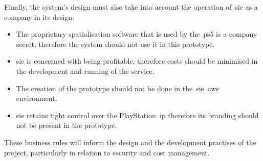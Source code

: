 Finally, the system's design must also take into account the operation of~\gls{sie} as a company in its design:

\begin{itemize}
    \item The proprietary spatialisation software that is used by the~\gls{ps5} is a company secret, therefore the system should not use it in this prototype.
    \item \gls{sie} is concerned with being profitable, therefore costs should be minimised in the development and running of the service.
    \item The creation of the prototype should not be done in the~\gls{sie}~\gls{aws} environment.
    \item \gls{sie} retains tight control over the PlayStation~\gls{ip} therefore its branding should not be present in the prototype.
\end{itemize}

These business rules will inform the design and the development practises of the project, particularly in relation to security and cost management.